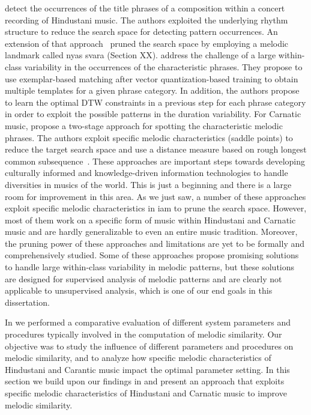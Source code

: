 \cite{Ross2012b} detect the occurrences of the title phrases of a composition within a concert recording of Hindustani music. The authors exploited the underlying rhythm structure to reduce the search space for detecting pattern occurrences. An extension of that approach~\citep{Ross2012} pruned the search space by employing a melodic landmark called \gls{nyas} \gls{svara} (Section XX). \cite{Rao2014} address the challenge of a large within-class variability in the occurrences of the characteristic phrases. They propose to use exemplar-based matching after vector quantization-based training to obtain multiple templates for a given phrase category. In addition, the authors propose to learn the optimal DTW constraints in a previous step for each phrase category in order to exploit the possible patterns in the duration variability. For Carnatic music, \cite{Ishwar2013} propose a two-stage approach for spotting the characteristic melodic phrases. The authors exploit specific melodic characteristics (saddle points) to reduce the target search space and use a distance measure based on rough longest common subsequence~\citep{lin2011music}. These approaches are important steps towards developing culturally informed and knowledge-driven information technologies to handle diversities in musics of the world. This is just a beginning and there is a large room for improvement in this area. As we just saw, a number of these approaches exploit specific melodic characteristics in \gls{iam} to prune the search space. However, most of them work on a specific form of music within Hindustani and Carnatic music and are hardly generalizable to even an entire music tradition. Moreover, the pruning power of these approaches and limitations are yet to be formally and comprehensively studied. Some of these approaches propose promising solutions to handle large within-class variability in melodic patterns, but these solutions are designed for supervised analysis of melodic patterns and are clearly not applicable to unsupervised analysis, which is one of our end goals in this dissertation.

In  we performed a comparative evaluation of different system parameters and procedures typically involved in the computation of melodic similarity. Our objective was to study the influence of different parameters and procedures on melodic similarity, and to analyze how specific melodic  characteristics of Hindustani and Carantic music impact the optimal parameter setting. In this section we build upon our findings in  and present an approach that exploits specific melodic characteristics of Hindustani and Carnatic music to improve melodic similarity. 

